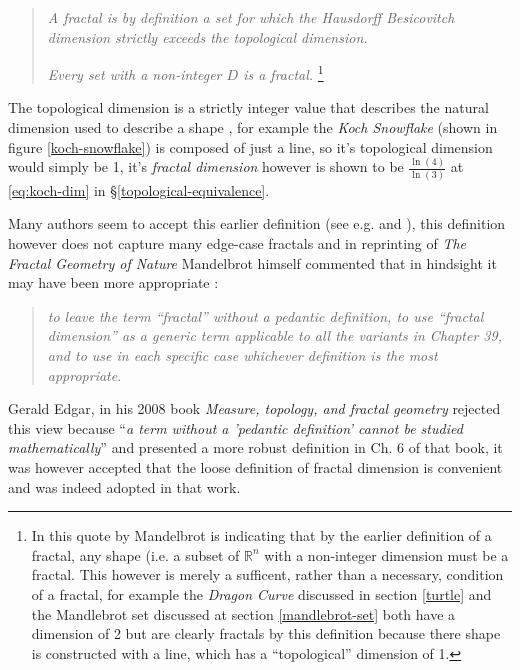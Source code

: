 \documentclass[a4paper,11pt,twoside]{article}
\begin{document}
\begin{quote}
\emph{A fractal is by definition a set for which the Hausdorff Besicovitch dimension
strictly exceeds the topological dimension.}

\emph{Every set with a non-integer \(D\) is a fractal.} \footnote{In this quote by Mandelbrot is indicating that by the earlier definition of a
fractal, any shape (i.e. a subset of \(\mathbb{R}^{n}\) with a non-integer
dimension must be a fractal. This however is merely a sufficent, rather than a
necessary, condition of a fractal, for example the \emph{Dragon Curve} discussed in
section \ref{turtle} and the Mandlebrot set discussed at section \ref{mandlebrot-set} both
have a dimension of 2 but are clearly fractals by this definition because there
shape is constructed with a line, which has a ``topological'' dimension of 1.}
\end{quote}

The topological dimension is a strictly integer value that describes the natural dimension used to describe a shape \cite{sandersonFractalsAreTypically2017},
for example the \emph{Koch Snowflake} (shown in figure \ref{koch-snowflake}) is composed of
just a line, so it's topological dimension would simply be 1, it's \emph{fractal
dimension} however is shown to be \(\frac{\ln\left( 4 \right)}{\ln\left( 3
\right)}\) at \eqref{eq:koch-dim} in \S\ref{topological-equivalence}.

Many authors seem to accept this earlier definition (see e.g. \cite[\S2.2]{vicsekFractalGrowthPhenomena1992} and \cite[\S2.1]{telChaoticDynamicsIntroduction2006}),
this definition however does not capture many edge-case fractals
 \cite[VII]{edgarMeasureTopologyFractal2008a} and in reprinting of \emph{The
Fractal Geometry of Nature} Mandelbrot himself commented that in hindsight it
may have been more appropriate \cite[p. 459]{mandelbrotFractalGeometryNature1982}:

\begin{quote}
\emph{to leave the term ``fractal” without a pedantic definition, to use “fractal dimension” as a generic term applicable to all the variants in Chapter 39, and to use in each specific case whichever definition is the most appropriate}.
\end{quote}

Gerald Edgar, in his 2008 book \emph{Measure, topology, and fractal geometry}
rejected this view because ``\emph{a term without a 'pedantic definition' cannot be
studied mathematically}'' \cite[VII]{edgarMeasureTopologyFractal2008a} and
presented a more robust definition in Ch. 6 of that book, it was however
accepted that the loose definition of fractal dimension is convenient and was
indeed adopted in that work.
\end{document}

